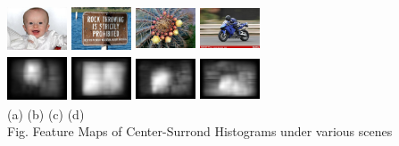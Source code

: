 \documentclass[10pt,twocolumn,letterpaper]{article}
\newcommand{\hs}{\hspace{0.58in}}
\begin{document}
    \begin{center}
    \includegraphics[width=0.7in,height=0.54in]{./Figures/CSH_image/1orig.jpg}
    \includegraphics[width=0.7in,height=0.54in]{./Figures/CSH_image/2orig.jpg}
    \includegraphics[width=0.7in,height=0.54in]{./Figures/CSH_image/3orig.jpg}
    \includegraphics[width=0.7in,height=0.54in]{./Figures/CSH_image/4orig.jpg}\\
    \includegraphics[width=0.7in,height=0.54in]{./Figures/CSH_image/1cont.jpg}
    \includegraphics[width=0.7in,height=0.54in]{./Figures/CSH_image/2cont.jpg}
    \includegraphics[width=0.7in,height=0.54in]{./Figures/CSH_image/3cont.jpg}
    \includegraphics[width=0.7in,height=0.54in]{./Figures/CSH_image/4cont.jpg}\\
    \footnotesize \hspace{0.1cm} (a) \hs (b) \hs  (c) \hs (d) \\
    Fig. Feature Maps of Center-Surrond Histograms under various scenes
    \end{center}
\end{document}
